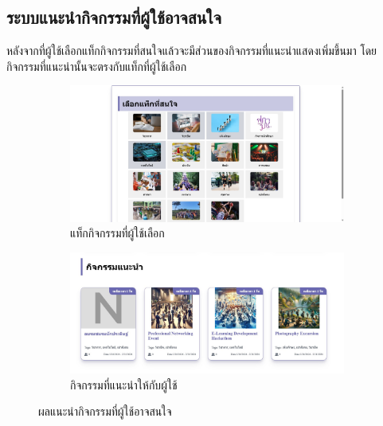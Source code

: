 \FloatBarrier

\newpage
\subsection{ระบบแนะนำกิจกรรมที่ผู้ใช้อาจสนใจ}
หลังจากที่ผู้ใช้เลือกแท็กกิจกรรมที่สนใจแล้วจะมีส่วนของกิจกรรมที่แนะนำแสดงเพิ่มขึ้นมา โดยกิจกรรมที่แนะนำนั้นจะตรงกับแท็กที่ผู้ใช้เลือก
\begin{figure}[h]
  \centering
  \begin{subfigure}[b]{0.4\linewidth}
    \includegraphics[width=\linewidth]{image/web/choose.jpeg}
    \caption{แท็กกิจกรรมที่ผู้ใช้เลือก}
  \end{subfigure}
  \hfill
  \begin{subfigure}[b]{0.4\linewidth}
    \includegraphics[width=\linewidth]{image/web/recommend.jpg}
    \caption{กิจกรรมที่แนะนำให้กับผู้ใช้}
  \end{subfigure}
  \caption{ผลแนะนำกิจกรรมที่ผู้ใช้อาจสนใจ}
  \label{fig:reccomended}
\end{figure}

\FloatBarrier


